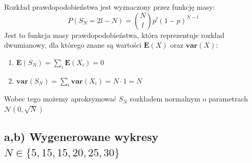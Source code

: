 \documentclass{article}
\begin{document}
Rozkład prawdopodobieństwa jest wyznaczony przez funkcję masy:
\[
P(S_N = 2l - N) = \binom{N}{l}p^l(1-p)^{N-l}
\]
Jest to funkcja masy prawdopodobieństwa, która reprezentuje rozkład dwumianowy, dla którego znane są wartości $\mathbf{E}(X)$ oraz $\mathbf{var}(X)$:
\begin{enumerate}
    \item $\mathbf{E}(S_N) = \sum_i\mathbf{E}(X_i) = 0$
    \item $\mathbf{var}(S_N) = \sum_i\mathbf{var}(X_i) = N \cdot 1 = N$
\end{enumerate}
Wobec tego możemy aproksymować $S_N$ rozkładem normalnym o parametrach $\mathcal{N}\left(0,\sqrt{N}\right)$

\subsection{a,b) Wygenerowane wykresy $N\in\{5,15,15,20,25,30\}$}
\end{document}
